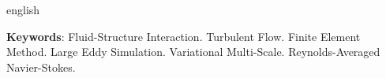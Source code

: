 \begin{resumo}[Abstract]
\begin{otherlanguage*}{english}
		\vspace{\onelineskip}

		\noindent
		\textbf{Keywords}: Fluid-Structure Interaction. Turbulent Flow. Finite Element Method. Large Eddy Simulation. Variational Multi-Scale. Reynolds-Averaged Navier-Stokes.
	\end{otherlanguage*}
\end{resumo}
